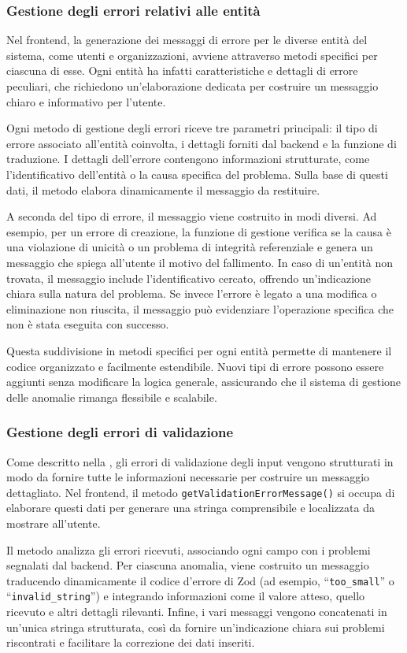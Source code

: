 \subsubsection{Gestione degli errori relativi alle entità}
Nel frontend, la generazione dei messaggi di errore per le diverse entità del sistema, come utenti e organizzazioni, avviene attraverso metodi specifici per ciascuna di esse. Ogni entità ha infatti caratteristiche e dettagli di errore peculiari, che richiedono un'elaborazione dedicata per costruire un messaggio chiaro e informativo per l'utente.

Ogni metodo di gestione degli errori riceve tre parametri principali: il tipo di errore associato all'entità coinvolta, i dettagli forniti dal backend e la funzione di traduzione. I dettagli dell’errore contengono informazioni strutturate, come l’identificativo dell’entità o la causa specifica del problema. Sulla base di questi dati, il metodo elabora dinamicamente il messaggio da restituire.

A seconda del tipo di errore, il messaggio viene costruito in modi diversi. Ad esempio, per un errore di creazione, la funzione di gestione verifica se la causa è una violazione di unicità o un problema di integrità referenziale e genera un messaggio che spiega all’utente il motivo del fallimento. In caso di un’entità non trovata, il messaggio include l’identificativo cercato, offrendo un'indicazione chiara sulla natura del problema. Se invece l’errore è legato a una modifica o eliminazione non riuscita, il messaggio può evidenziare l’operazione specifica che non è stata eseguita con successo.

Questa suddivisione in metodi specifici per ogni entità permette di mantenere il codice organizzato e facilmente estendibile. Nuovi tipi di errore possono essere aggiunti senza modificare la logica generale, assicurando che il sistema di gestione delle anomalie rimanga flessibile e scalabile.

\subsubsection{Gestione degli errori di validazione}
Come descritto nella , gli errori di validazione degli input vengono strutturati in modo da fornire tutte le informazioni necessarie per costruire un messaggio dettagliato. Nel frontend, il metodo \texttt{getValidationErrorMessage()} si occupa di elaborare questi dati per generare una stringa comprensibile e localizzata da mostrare all’utente.
%

%
Il metodo analizza gli errori ricevuti, associando ogni campo con i problemi segnalati dal backend. Per ciascuna anomalia, viene costruito un messaggio traducendo dinamicamente il codice d’errore di Zod (ad esempio, ``\texttt{too\_small}'' o ``\texttt{invalid\_string}'') e integrando informazioni come il valore atteso, quello ricevuto e altri dettagli rilevanti. Infine, i vari messaggi vengono concatenati in un'unica stringa strutturata, così da fornire un’indicazione chiara sui problemi riscontrati e facilitare la correzione dei dati inseriti.

